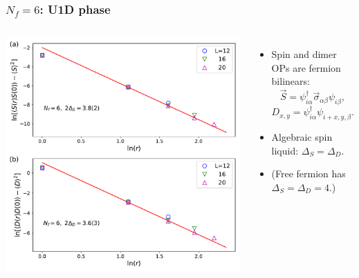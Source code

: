 \documentclass[xcolor=table, 10pt, aspectratio=169]{beamer}
\begin{document}
\begin{frame}
  \frametitle{$N_f=6$: U1D phase}
  \begin{columns}
    \includegraphics[width=\textwidth]{n6decay}
		\begin{itemize}
			\item Spin and dimer OPs are fermion bilinears:
			\[\vec S = \psi^\dagger_{i\alpha}\vec\sigma_{\alpha\beta}\psi_{i\beta},\]
			\[D_{x,y} = \psi^\dagger_{i\alpha}\psi_{i+x,y,\beta}.\]
			\item Algebraic spin liquid: $\Delta_S = \Delta_D$.
		  \item (Free fermion has $\Delta_S=\Delta_D = 4$.)
		\end{itemize}
  \end{columns}
\end{frame}
\end{document}
